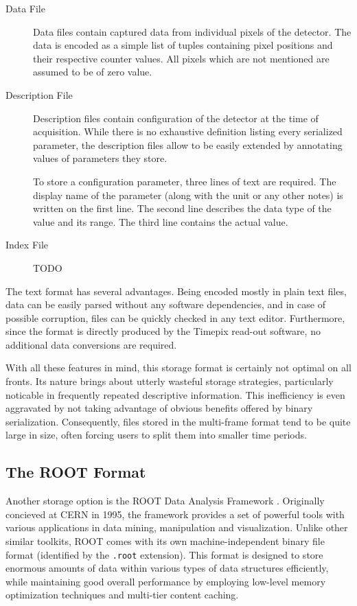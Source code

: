 \begin{description}
	\item[Data File]
	Data files contain captured data from individual pixels of the detector. The data is encoded as a simple list of tuples containing pixel positions and their respective counter values. All pixels which are not mentioned are assumed to be of zero value.

	\item[Description File]
	Description files contain configuration of the detector at the time of acquisition. While there is no exhaustive definition listing every serialized parameter, the description files allow to be easily extended by annotating values of parameters they store.

	To store a configuration parameter, three lines of text are required. The display name of the parameter (along with the unit or any other notes) is written on the first line. The second line describes the data type of the value and its range. The third line contains the actual value.

	\item[Index File]
	TODO
\end{description}

The text format has several advantages. Being encoded mostly in plain text files, data can be easily parsed without any software dependencies, and in case of possible corruption, files can be quickly checked in any text editor. Furthermore, since the format is directly produced by the Timepix read-out software, no additional data conversions are required.

With all these features in mind, this storage format is certainly not optimal on all fronts. Its nature brings about utterly wasteful storage strategies, particularly noticable in frequently repeated descriptive information. This inefficiency is even aggravated by not taking advantage of obvious benefits offered by binary serialization. Consequently, files stored in the multi-frame format tend to be quite large in size, often forcing users to split them into smaller time periods.

\subsection{The ROOT Format}
Another storage option is the ROOT Data Analysis Framework \cite{Brun199781}. Originally concieved at CERN in 1995, the framework provides a set of powerful tools with various applications in data mining, manipulation and visualization. Unlike other similar toolkits, ROOT comes with its own machine-independent binary file format (identified by the \texttt{.root} extension). This format is designed to store enormous amounts of data within various types of data structures efficiently, while maintaining good overall performance by employing low-level memory optimization techniques and multi-tier content caching.

